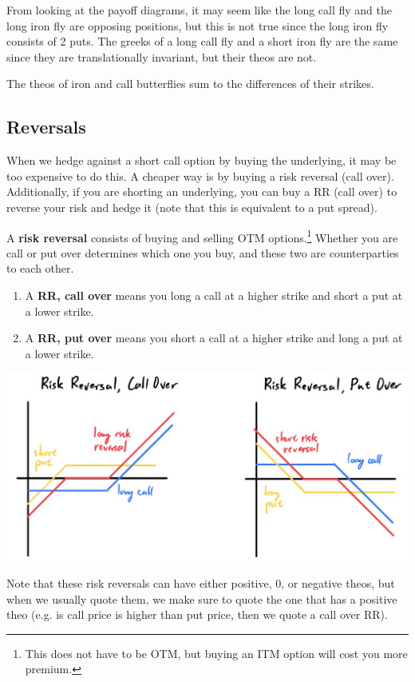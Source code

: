 \documentclass{article}
\begin{document}
    From looking at the payoff diagrams, it may seem like the long call fly and the long iron fly are opposing positions, but this is not true since the long iron fly consists of 2 puts. The greeks of a long call fly and a short iron fly are the same since they are translationally invariant, but their theos are not. 

    \begin{theorem}
      The theos of iron and call butterflies sum to the differences of their strikes. 
    \end{theorem}

  \subsection{Reversals}
  
    When we hedge against a short call option by buying the underlying, it may be too expensive to do this. A cheaper way is by buying a risk reversal (call over). Additionally, if you are shorting an underlying, you can buy a RR (call over) to reverse your risk and hedge it (note that this is equivalent to a put spread). 

    \begin{definition}
      A \textbf{risk reversal} consists of buying and selling OTM options.\footnote{This does not have to be OTM, but buying an ITM option will cost you more premium. } Whether you are call or put over determines which one you buy, and these two are counterparties to each other.  
      \begin{enumerate}
        \item A \textbf{RR, call over} means you long a call at a higher strike and short a put at a lower strike. 
        \item A \textbf{RR, put over} means you short a call at a higher strike and long a put at a lower strike. 
      \end{enumerate}
      \begin{center}
        \includegraphics[scale=0.3]{img/risk_reversal.png}
      \end{center}
      Note that these risk reversals can have either positive, 0, or negative theos, but when we usually quote them, we make sure to quote the one that has a positive theo (e.g. is call price is higher than put price, then we quote a call over RR). 
    \end{definition}
\end{document}
